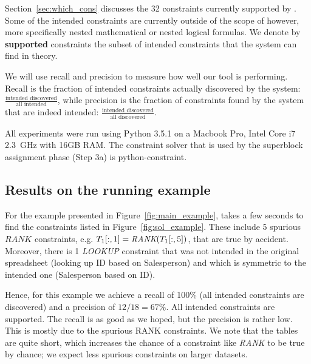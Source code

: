 Section~\ref{sec:which_cons} discusses the 32 constraints currently supported by \sname {}. Some of the intended constraints are currently outside of the scope of \sname however, more specifically nested mathematical or nested logical formulas. We denote by \textbf{supported} constraints the subset of intended constraints that the system can find in theory.

We will use recall and precision to measure how well our tool is performing. Recall is the fraction of intended constraints actually discovered by the system: $\frac{\text{intended discovered}}{\text{all intended}}$, while precision is the fraction of constraints found by the system that are indeed intended: $\frac{\text{intended discovered}}{\text{all discovered}}$.

All experiments were run using Python 3.5.1 on a Macbook Pro, Intel Core i7 2.3~GHz with 16GB RAM.
The constraint solver that is used by the superblock assignment phase (Step 3a) is python-constraint\cite{python_constraint}.



\subsection{Results on the running example}
For the example presented in Figure~\ref{fig:main_example},
\sname takes a few seconds to find the constraints listed in Figure~\ref{fig:sol_example}.
These include 5 spurious $\textit{RANK}$ constraints, e.g. $T_1[:,1] = \textit{RANK}(T_1[:,5])$, that are true by accident.
Moreover, there is 1 \textit{LOOKUP} constraint that was not intended in the original spreadsheet (looking up ID based on Salesperson) and which is symmetric to the intended one (Salesperson based on ID).

Hence, for this example we achieve a recall of 100\% (all intended constraints are discovered) and a precision of $12/18 = 67\%$. All intended constraints are supported. The recall is as good as we hoped, but the precision is rather low. This is mostly due to the spurious RANK constraints. We note that the tables are quite short, which increases the chance of a constraint like \textit{RANK} to be true by chance; we expect less spurious constraints on larger datasets.

